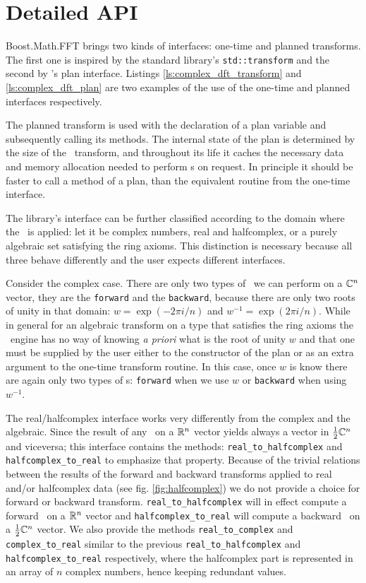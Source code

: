 \section{Detailed API}
Boost.Math.FFT brings two kinds of interfaces: one-time and planned transforms.
The first one is inspired by the standard library's \texttt{std::transform} 
and the second by \fftw's plan interface. Listings
\ref{ls:complex_dft_transform} and \ref{ls:complex_dft_plan} are two examples of
the use of the one-time and planned interfaces respectively.

The planned transform is used with
the declaration of a plan variable and subsequently calling its methods.
The internal state of the plan is determined by the size of the \dft\ transform,
and throughout its life it caches the necessary data and memory allocation
needed to perform \dft s on request. In principle it should be faster to call a
method of a plan, than the equivalent routine from the one-time interface.

The library's interface can be further classified according to the domain where
the \dft\ is applied: let it be complex numbers, real and halfcomplex, or a
purely algebraic set satisfying the ring axioms. This distinction is necessary
because all three behave differently and the user expects different interfaces.

Consider the complex case. There are only two types of \dft\ we can perform on
a $\mathbb{C}^n$ vector, they are the \verb|forward| and the \verb|backward|, 
because there are only two roots of unity in that domain:
$w = \exp( - 2 \pi i/n)$ 
and
$w^{-1} = \exp( 2 \pi i/n)$.
While in general for an algebraic transform on a type that satisfies the ring
axioms the \dft\ engine has no way of knowing \emph{a priori} what is the root
of unity $w$ and that one must be supplied by the user either to the constructor
of the plan or as an extra argument to the one-time transform routine. In this
case, once $w$ is know there are again only two types of \dft s: \verb|forward| 
when we use $w$ or \verb|backward| when using $w^{-1}$.

The real/halfcomplex interface works very differently from the complex and the
algebraic. Since the result of any \dft\ on a $\mathbb{R}^n$ vector yields always a
vector in $\frac{1}{2}\mathbb{C}^n$ and viceversa; this interface contains the methods:
\verb|real_to_halfcomplex| and \verb|halfcomplex_to_real| to emphasize that
property. Because of the trivial relations between the results of the forward
and backward transforms applied to real and/or halfcomplex data (see fig.
\ref{fig:halfcomplex}) we do not provide a choice for forward or backward
transform. \verb|real_to_halfcomplex| will in effect compute a forward \dft\ on
a $\mathbb{R}^n$ vector and \verb|halfcomplex_to_real| will compute a backward \dft\ on a
$\frac{1}{2}\mathbb{C}^n$ vector. We also provide the methods \verb|real_to_complex|
and \verb|complex_to_real| similar to the previous \verb|real_to_halfcomplex|
and \verb|halfcomplex_to_real| respectively, where the halfcomplex part is
represented in an array of $n$ complex numbers, hence keeping redundant values.


